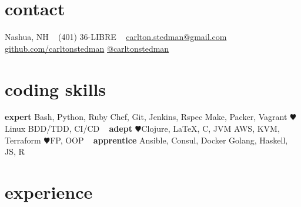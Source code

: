 \documentclass[]{vitae-cv}
\begin{document}


\begin{aside}
\section{contact}
Nashua, NH
~
(401) 36-LIBRE
~
\href{mailto:carlton.stedman@gmail.com}{carlton.stedman@gmail.com}
\href{http://github.com/carltonstedman}{github.com/carltonstedman}
\href{http://twitter.com/carltonstedman}{@carltonstedman}
\section{coding skills}
\textbf{expert}
Bash, Python, Ruby
Chef, Git, Jenkins, Rspec
Make, Packer, Vagrant
{\color{red} $\varheartsuit$}Linux
BDD/TDD, CI/CD
~
\textbf{adept}
{\color{red} $\varheartsuit$}Clojure, \LaTeX, C, JVM
AWS, KVM, Terraform
{\color{red} $\varheartsuit$}FP, OOP
~
\textbf{apprentice}
Ansible, Consul, Docker
Golang, Haskell, JS, R
\end{aside}


\section{experience}
\end{document}
